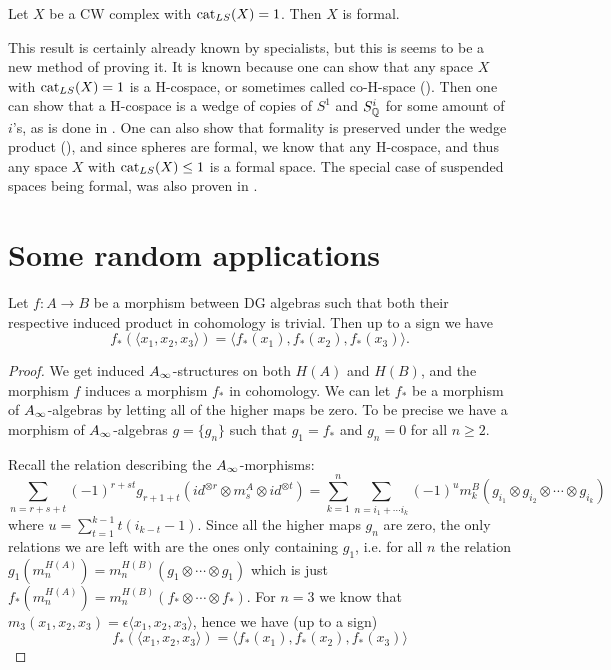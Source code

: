 \begin{corollary}
\label{cor:ls1_then_formal}
Let $X$ be a CW complex with $\text{cat}_{LS}(X)=1$. Then $X$ is formal. 
\end{corollary}

This result is certainly already known by specialists, but this is seems to be a new method of proving it. It is known because one can show that any space $X$ with $\text{cat}_{LS}(X)=1$ is a H-cospace, or sometimes called co-H-space (\cite{hess}). Then one can show that a H-cospace is a wedge of copies of $S^1$ and $S_{\mathbb{Q}}^i$ for some amount of $i$'s, as is done in \cite[Theorem 3.]{co-H-space}. One can also show that formality is preserved under the wedge product (\cite{hess}), and since spheres are formal, we know that any H-cospace, and thus any space $X$ with $\text{cat}_{LS}(X)\leq 1$ is a formal space. The special case of suspended spaces being formal, was also proven in \cite[Proposition 13.9.]{FHT}. 



\iffalse

\section{Some random applications}

\begin{proposition}
Let $f\colon A\longrightarrow B$ be a morphism between DG algebras such that both their respective induced product in cohomology is trivial. Then up to a sign we have
\begin{equation*}
    f_*(\langle x_1, x_2, x_3\rangle) = \langle f_*(x_1), f_*(x_2),  f_*(x_3)\rangle.
\end{equation*}
\end{proposition}
\begin{proof}
We get induced $A_{\infty}$-structures on both $H(A)$ and $H(B)$, and the morphism $f$ induces a morphism $f_*$ in cohomology. We can let $f_*$ be a morphism of $A_{\infty}$-algebras by letting all of the higher maps be zero. To be precise we have a morphism of $A_{\infty}$-algebras $g = \{g_n\}$ such that $g_1 = f_*$ and $g_n=0$ for all $n\geq 2$. 

Recall the relation describing the $A_{\infty}$-morphisms:
\begin{equation*}
    \sum_{n = r+s+t}(-1)^{r+st}g_{r+1+t}(id^{\otimes r}\otimes m_s^A \otimes id^{\otimes t}) = \sum_{k=1}^{n}\sum_{n=i_1+\cdots i_k}(-1)^{u} m_k^B(g_{i_1}\otimes g_{i_2}\otimes \cdots \otimes g_{i_k})
\end{equation*}
where $u=\displaystyle \sum_{t=1}^{k-1}t(i_{k-t}-1)$. Since all the higher maps $g_n$ are zero, the only relations we are left with are the ones only containing $g_1$, i.e. for all $n$ the relation $g_1(m_n^{H(A)}) = m_n^{H(B)}(g_1\otimes \cdots \otimes g_1)$ which is just $f_*(m_n^{H(A)}) = m_n^{H(B)}(f_*\otimes \cdots \otimes f_*)$. For $n=3$ we know that $m_3(x_1, x_2, x_3) = \epsilon \langle x_1, x_2, x_3\rangle$, hence we have (up to a sign)
\begin{equation*}
    f_*(\langle x_1, x_2, x_3\rangle) = \langle f_*(x_1), f_*(x_2),  f_*(x_3)\rangle
\end{equation*}
\end{proof}

